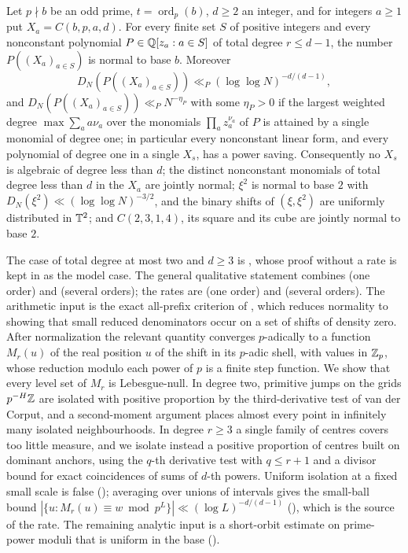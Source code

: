 \documentclass[11pt]{article}
\DeclareMathOperator{\ord}{ord}
\begin{document}
\begin{maintheorem}\label{thm:D}
Let $p\nmid b$ be an odd prime, $t=\ord_p(b)$, $d\ge2$ an integer, and for integers $a\ge1$ put
$X_a=C(b,p,a,d)$. For every finite set $S$ of positive integers and every nonconstant polynomial
$P\in\mathbb Q[z_a:a\in S]$ of total degree $r\le d-1$, the number $P((X_a)_{a\in S})$ is normal to base $b$.
Moreover
\[
D_N(P((X_a)_{a\in S}))\ll_P(\log\log N)^{-d/(d-1)},
\]
and $D_N(P((X_a)_{a\in S}))\ll_PN^{-\eta_P}$ with some $\eta_P>0$ if the largest weighted degree
$\max\sum_a a\nu_a$ over the monomials $\prod_az_a^{\nu_a}$ of $P$ is attained by a single monomial of degree
one; in particular every nonconstant linear form, and every polynomial of degree one in a single $X_s$,
has a power saving. Consequently no $X_s$ is algebraic of degree less than $d$; the distinct
nonconstant monomials of total degree less than $d$ in the $X_a$ are jointly normal; $\xi^2$ is normal
to base $2$ with $D_N(\xi^2)\ll(\log\log N)^{-3/2}$, and the binary shifts of $(\xi,\xi^2)$ are
uniformly distributed in $\mathbb T^2$; and $C(2,3,1,4)$, its square and its cube are jointly normal to base $2$.
\end{maintheorem}

The case of total degree at most two and $d\ge3$ is , whose proof without a rate
is kept in  as the model case. The general qualitative statement combines
 (one order) and  (several orders); the rates are
 (one order) and  (several orders). The arithmetic input is the exact all-prefix criterion of ,
which reduces normality to showing that small reduced denominators occur on a set of shifts of density
zero. After normalization the relevant quantity converges $p$-adically to a function $M_r(u)$ of the
real position $u$ of the shift in its $p$-adic shell, with values in $\mathbb Z_p$, whose reduction modulo
each power of $p$ is a finite step function. We show that every level set of $M_r$ is Lebesgue-null.
In degree two, primitive jumps on the grids $p^{-H}\mathbb Z$ are isolated with positive proportion by the
third-derivative test of van der Corput, and a second-moment argument places almost every point in
infinitely many isolated neighbourhoods. In degree $r\ge3$ a single family of centres covers too little
measure, and we isolate instead a positive proportion of centres built on dominant anchors, using the
$q$-th derivative test with $q\le r+1$ and a divisor bound for exact coincidences of sums of $d$-th
powers. Uniform isolation at a fixed small scale is false (); averaging over unions
of intervals gives the small-ball bound $|\{u:M_r(u)\equiv w\bmod p^L\}|\ll(\log L)^{-d/(d-1)}$
(), which is the source of the rate. The remaining analytic input is a short-orbit
estimate on prime-power moduli that is uniform in the base ().
\end{document}
